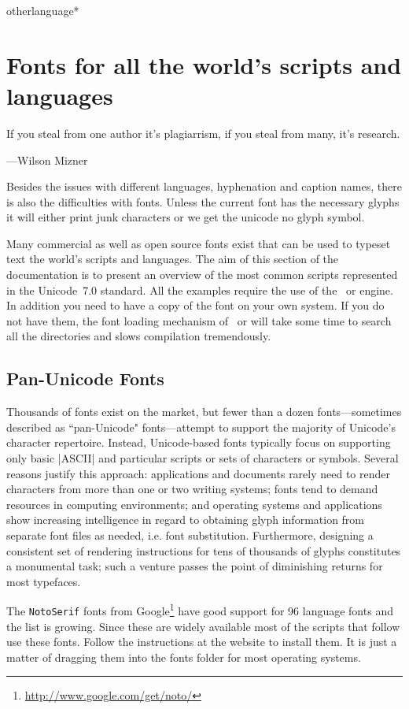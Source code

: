 \begin{docCommandd}{otherlanguage*} { }
\section{Fonts for all the world's scripts and languages}

\epigraph{If you steal from one author it's plagiarrism, if you steal from many, it's research.}{
---Wilson Mizner}

Besides the issues with different languages, hyphenation and caption names, there is also the difficulties with fonts. Unless the current font has the necessary glyphs it will either print junk characters or we get the unicode no glyph symbol.

Many commercial as well as open source fonts exist that can be used to typeset text the world's scripts and languages. The aim of this section of the documentation is to present an overview of the most common scripts represented in the Unicode~7.0 standard. All the examples require the use of the \XeTeX\ or \LUATEX engine. In addition you need to have a copy of the font on your own system. If you do not have them, the font loading mechanism of \XeTeX\ or \LUATEX will take some time to search all the directories and slows compilation tremendously. 

\subsection{Pan-Unicode Fonts}

Thousands of fonts exist on the market, but fewer than a dozen fonts—sometimes described as ``pan-Unicode" fonts—attempt to support the majority of Unicode's character repertoire. Instead, Unicode-based fonts typically focus on supporting only basic |ASCII| and particular scripts or sets of characters or symbols. Several reasons justify this approach: applications and documents rarely need to render characters from more than one or two writing systems; fonts tend to demand resources in computing environments; and operating systems and applications show increasing intelligence in regard to obtaining glyph information from separate font files as needed, i.e. font substitution. Furthermore, designing a consistent set of rendering instructions for tens of thousands of glyphs constitutes a monumental task; such a venture passes the point of diminishing returns for most typefaces.

The \texttt{NotoSerif} fonts from Google\footnote{\protect\url{http://www.google.com/get/noto/}} have good support for 96 language fonts and the list is growing. Since these are widely available most of the scripts that follow use these fonts. Follow the instructions at the website to install them. It is just a matter of dragging them into the fonts folder for most operating systems.


\end{docCommandd}
